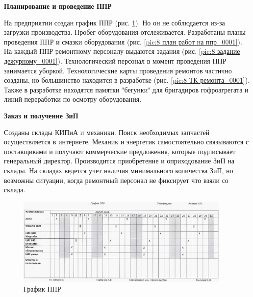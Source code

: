\textbf{Планирование и проведение ППР}

На предприятии создан график ППР (рис. \ref{pic:8 График ппр_0001}).  Но он не соблюдается из-за загрузки производства. Пробег оборудования отслеживается. Разработаны планы проведения ППР и смазки оборудования (рис. \ref{pic:8 план работ на ппр_0001}). На каждый ППР ремонтному персоналу выдаются задания (рис. \ref{pic:8 задание дежурному_0001}). Технологический персонал в момент проведения ППР занимается уборкой.  Технологические карты проведения ремонтов частично созданы, но большинство находится в разработке (рис. \ref{pic:8 ТК ремонта_0001}). Также в разработке находятся памятки "бегунки" для бригадиров гофроагрегата и линий переработки по осмотру оборудования.

\textbf{Заказ и получение ЗиП}

Созданы склады КИПиА и механики. Поиск необходимых запчастей осуществляется в интернете. Механик и энергетик самостоятельно связываются с поставщиками и получают коммерческие предложения, которые подписывает генеральный директор. Производится приобретение и оприходование ЗиП на склады. На складах ведется учет наличия минимального количества ЗиП, но возможны ситуации, когда ремонтный персонал не фиксирует что взяли со склада. %



\clearpage

\begin{figure}
\begin{center}
  \includegraphics[height=0.94\textheight, width=0.94\textwidth, keepaspectratio]{Pics 1/8 График ппр_0001.jpg }
\end{center}
  \caption{График ППР}
  \label{pic:8 График ппр_0001}
\end{figure}

